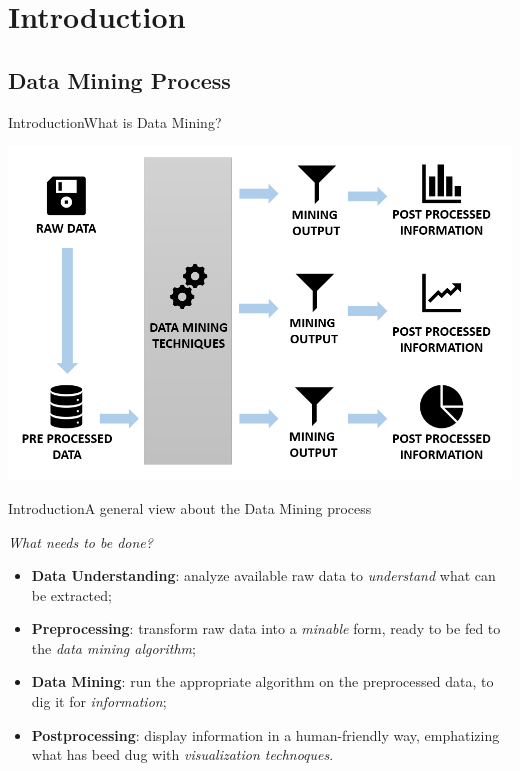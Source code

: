 \section{Introduction}
\subsection{Data Mining Process}
\begin{frame}{Introduction}{What is Data Mining?}

\noindent\begin{centering}
\includegraphics[scale=0.32]{img1_noback.png}
\end{centering}

\end{frame}

\begin{frame}{Introduction}{A general view about the Data Mining process}

    \centering\textit{What needs to be done?} \vspace{0,3cm}

	\begin{block}{}
		\begin{itemize}
			\item<1-> \textbf{Data Understanding}: analyze available raw data to \emph{understand} what can be extracted;
			\item<2-> \textbf{Preprocessing}: transform raw data into a \emph{minable} form, ready to be fed to the \emph{data mining algorithm};
			\item<3-> \textbf{Data Mining}: run the appropriate algorithm on the preprocessed data, to dig it for \emph{information};
			\item<4-> \textbf{Postprocessing}: display information in a human-friendly way, emphatizing what has beed dug with \emph{visualization technoques}.
		\end{itemize}
	\end{block}

\end{frame}

